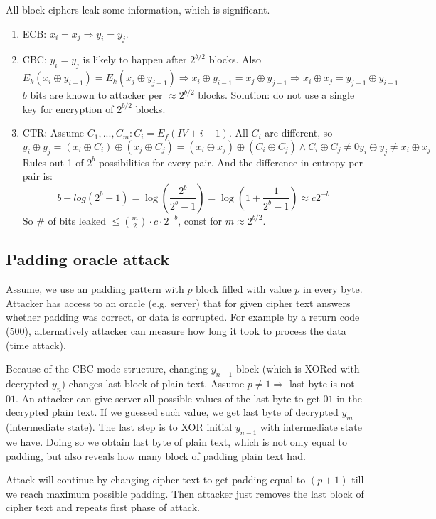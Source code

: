 All block ciphers leak some information, which is significant.
\begin{enumerate}
	\item ECB: $x_i = x_j \Rightarrow y_i = y_j$.
	\item CBC: $y_i = y_j$ is likely to happen after $2^{b/2}$ blocks. Also
		\[ E_k(x_i \oplus y_{i - 1}) = E_k(x_j \oplus y_{j - 1}) \Rightarrow  x_i \oplus y_{i - 1} = x_j \oplus y_{j - 1} \Rightarrow x_i \oplus x_j = y_{j - 1} \oplus y_{i - 1} \]
		$b$ bits are known to attacker per $\approx 2^{b/2}$ blocks.
		Solution: do not use a single key for encryption of $2^{b/2}$ blocks.
	\item CTR: Assume $C_1, ..., C_m: C_i = E_f(IV + i - 1)$. All $C_i$ are different, so
		\[ y_i \oplus y_j = (x_i \oplus C_i) \oplus (x_j \oplus C_j) = (x_i \oplus x_j) \oplus (C_i \oplus C_j) \land C_i \oplus C_j \neq 0 y_i \oplus y_j \neq x_i \oplus x_j\]
		Rules out 1 of $2^b$ possibilities for every pair. And the difference in entropy per pair is:
		\[ b - log (2^b - 1) = \log\left(\frac{2^b}{2^b - 1}\right) = \log\left(1 + \frac{1}{2^b - 1}\right) \approx c 2^{-b} \]
		So \# of bits leaked $\leq \binom{m}{2} \cdot c \cdot 2^{-b}$, const for $m \approx 2^{b/2}$.
\end{enumerate}

\subsection{Padding oracle attack}

Assume, we use an padding pattern with $p$ block filled with value $p$ in every byte.
Attacker has access to an oracle (e.g. server) that for given cipher text answers whether padding was correct, or data is corrupted.
For example by a return code (500), alternatively attacker can measure how long it took to process the data (time attack).

Because of the CBC mode structure, changing $y_{n-1}$ block (which is XORed with decrypted $y_n$) changes last block of plain text.
Assume $p\neq 1\Rightarrow$ last byte is not $01$. An attacker can give server all possible values of the last byte to get $01$ in the decrypted plain text.
If we guessed such value, we get last byte of decrypted $y_m$ (intermediate state). The last step is to XOR initial $y_{n-1}$ with intermediate state we have. Doing so we obtain last byte of plain text, which is not only equal to padding, but also reveals how many block of padding plain text had.

Attack will continue by changing cipher text to get padding equal to $(p+1)$ till we reach maximum possible padding. Then attacker just removes the last block of cipher text and repeats first phase of attack.

